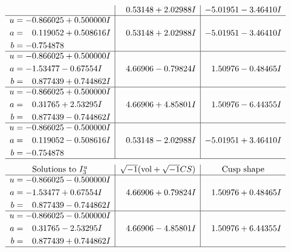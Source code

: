 \documentclass[1p]{elsarticle_modified}
\theoremstyle{definition}
\newcommand{\I}{\sqrt{-1}}
\begin{document}
$$\begin{array}{c|c|c}
 & \phantom{-}0.53148 + 2.02988 I & -5.01951 - 3.46410 I \\ \hline\begin{aligned}
u &= -0.866025 + 0.500000 I \\
a &= \phantom{-}0.119052 + 0.508616 I \\
b &= -0.754878\phantom{ +0.000000I}\end{aligned}
 & \phantom{-}0.53148 + 2.02988 I & -5.01951 - 3.46410 I \\ \hline\begin{aligned}
u &= -0.866025 + 0.500000 I \\
a &= -1.53477 - 0.67554 I \\
b &= \phantom{-}0.877439 + 0.744862 I\end{aligned}
 & \phantom{-}4.66906 - 0.79824 I & \phantom{-}1.50976 - 0.48465 I \\ \hline\begin{aligned}
u &= -0.866025 + 0.500000 I \\
a &= \phantom{-}0.31765 + 2.53295 I \\
b &= \phantom{-}0.877439 - 0.744862 I\end{aligned}
 & \phantom{-}4.66906 + 4.85801 I & \phantom{-}1.50976 - 6.44355 I \\ \hline\begin{aligned}
u &= -0.866025 - 0.500000 I \\
a &= \phantom{-}0.119052 - 0.508616 I \\
b &= -0.754878\phantom{ +0.000000I}\end{aligned}
 & \phantom{-}0.53148 - 2.02988 I & -5.01951 + 3.46410 I\\
 \hline 
 \end{array}$$\newpage$$\begin{array}{c|c|c}  
\text{Solutions to }I^u_{3}& \I (\text{vol} + \sqrt{-1}CS) & \text{Cusp shape}\\
 \hline 
\begin{aligned}
u &= -0.866025 - 0.500000 I \\
a &= -1.53477 + 0.67554 I \\
b &= \phantom{-}0.877439 - 0.744862 I\end{aligned}
 & \phantom{-}4.66906 + 0.79824 I & \phantom{-}1.50976 + 0.48465 I \\ \hline\begin{aligned}
u &= -0.866025 - 0.500000 I \\
a &= \phantom{-}0.31765 - 2.53295 I \\
b &= \phantom{-}0.877439 + 0.744862 I\end{aligned}
 & \phantom{-}4.66906 - 4.85801 I & \phantom{-}1.50976 + 6.44355 I\\
 \hline 
 \end{array}$$\newpage
\end{document}
